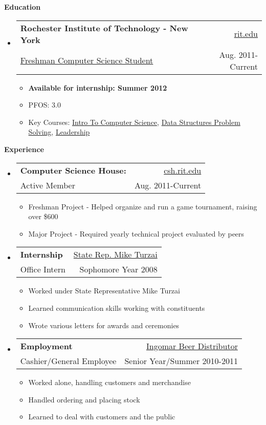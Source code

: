 \documentclass[letterpaper,11pt]{article}
\makeatletter
\newcommand{\resitem}[1]{\item #1 \vspace{-2pt}}
\newcommand{\resheading}[1]{{\large \colorbox{mygrey}{\begin{minipage}{\textwidth}{\textbf{#1 \vphantom{p\^{E}}}}\end{minipage}}}}
\newcommand{\ressubheading}[4]{
\begin{tabular*}{6.5in}{l@{\extracolsep{\fill}}r}
		\textbf{#1} & #2 \\
		{#3} & {#4} \\
\end{tabular*}\vspace{-6pt}}
\makeatother
\begin{document}
\resheading{Education}
	{ \footnotesize
	\begin{itemize}
		\item
			\ressubheading{Rochester Institute of Technology - New York}{\href{http://www.rit.edu/}{rit.edu}}{\href{http://www.cs.rit.edu/}{Freshman Computer Science Student}}{Aug. 2011-Current}
				{ \footnotesize
				\begin{itemize}
					\resitem{\textbf{Available for internship: Summer 2012}}
					\resitem{PFOS: 3.0}
					\resitem{Key Courses: \href{https://register.rit.edu/courseSchedule/20111/40/03/241/05}{Intro To Computer Science}, \href{https://register.rit.edu/courseSchedule/20112/40/03/242/05}{Data Structures Problem Solving}, \href{https://register.rit.edu/courseSchedule/20112/17/20/053/03}{Leadership}}
				\end{itemize}
				}
	\end{itemize} %
	}
\resheading{Experience}
{\footnotesize
	\begin{itemize}
		\item 
			\ressubheading{Computer Science House:}{\href{http://www.csh.rit.edu/}{csh.rit.edu}}{Active Member}{Aug. 2011-Current} 
			{ \footnotesize
				\begin{itemize}		
					\resitem{{Freshman Project} - Helped organize and run a game tournament, raising over \$600} 
					\resitem{{Major Project} - Required yearly technical project evaluated by peers}
				\end{itemize}
			}
		\item	
			\ressubheading{Internship}{\href{http://www.repturzai.com/}{State Rep. Mike Turzai}}{Office Intern}{Sophomore Year 2008} 
				{ \footnotesize 
				\begin{itemize}
					\item{Worked under State Representative Mike Turzai}
					\item{Learned communication skills working with constituents}
					\item{Wrote various letters for awards and ceremonies}
				\end{itemize}
				}
		\item 
			\ressubheading{Employment}{\href{https://www.facebook.com/pages/Ingomar-Beer-Distributor/120207034680524}{Ingomar Beer Distributor}}{Cashier/General Employee}{Senior Year/Summer 2010-2011}
			{ \footnotesize
				\begin{itemize}
					\item{Worked alone, handling customers and merchandise}
					\item{Handled ordering and placing stock}
					\item{Learned to deal with customers and the public}
				\end{itemize}
			}
		
	\end{itemize}  %
}
\end{document}
